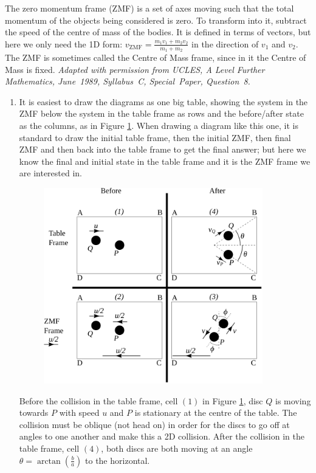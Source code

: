 \begin{hint}
{\begin{enumerate}[resume]
\end{enumerate}
}
{The zero momentum frame (ZMF) is a set of axes moving such that the total momentum of the objects being considered is zero. To transform into it, subtract the speed of the centre of mass of the bodies. It is defined in terms of vectors, but here we only need the 1D form:  $v_{\textrm{ZMF}} = \frac{m_{1}v_{1} + m_{2}v_{2}}{m_{1} + m_{2}}$ in the direction of $v_{1}$ and $v_{2}$. The ZMF is sometimes called the Centre of Mass frame, since in it the Centre of Mass is fixed.}
{\textit{Adapted with permission from UCLES, A Level Further Mathematics, June~1989, Syllabus~C, Special~Paper, Question~8.}}
{\begin{enumerate}
	\item It is easiest to draw the diagrams as one big table, showing the system in the ZMF below the system in the table frame as rows and the before/after state as the columns, as in Figure \ref{fig:Dynamics_ZMF_table_collision}. When drawing a diagram like this one, it is standard to draw the initial table frame, then the initial ZMF, then final ZMF and then back into the table frame to get the final answer; but here we know the final and initial state in the table frame and it is the ZMF frame we are interested in.
\begin{figure}[h]
\centering
\includegraphics[width=0.9\textwidth]{../../../figures/Dynamics_ZMF_table_collision.svg}
\caption{}
\label{fig:Dynamics_ZMF_table_collision}
\end{figure}

Before the collision in the table frame, cell $(1)$ in Figure \ref{fig:Dynamics_ZMF_table_collision}, disc $Q$ is moving towards $P$ with speed $u$ and $P$ is stationary at the centre of the table. The collision must be oblique (not head on) in order for the discs to go off at angles to one another and make this a 2D collision. After the collision in the table frame, cell $(4)$, both discs are both moving at an angle $\theta = \arctan(\frac{b}{a})$ to the horizontal.


\end{enumerate}}
\end{hint}
